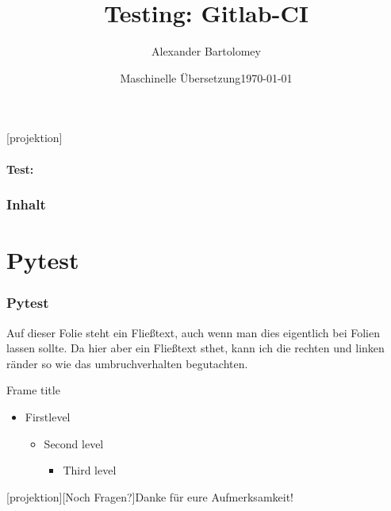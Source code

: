 \documentclass[t]{beamer}
\title{Testing: Gitlab-CI}
\subtitle{}
\date[RWTH]{Maschinelle Übersetzung\enskip \enskip\today}
\author{Alexander Bartolomey}
\institute[RWTH]{RWTH Aachen University}
\begin{document}
[projektion]{}
\begin{frame}[plain]
\titlepage{}
\end{frame}



\begin{frame}
  \framesubtitle{Test:}
  \frametitle{Inhalt}
\end{frame}

\section{Pytest}

\begin{frame}
  \frametitle{Pytest}
  Auf dieser Folie steht ein Fließtext, auch wenn man dies eigentlich
  bei Folien lassen sollte.  Da hier aber ein Fließtext sthet, kann
  ich die rechten und linken ränder so wie das umbruchverhalten begutachten.
\end{frame}


\begin{frame}{Frame title}
  \begin{itemize}
    \item First\alert{level}
    \begin{itemize}
      \item Second level
      \begin{itemize}
      \item Third level
    \end{itemize}
  \end{itemize}
\end{itemize}
\end{frame}

[projektion][Noch Fragen?]{Danke für
  eure Aufmerksamkeit!}
\begin{frame}[plain]
\end{frame}
\end{document}
